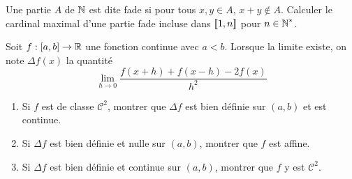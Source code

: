 \begin{exo}
    \label{misc1}
    Une partie $A$ de $\operatorname{\mathbb N}$ est dite fade si pour tous $x,y\in A$, $x+y\notin A$.
    Calculer le cardinal maximal d'une partie fade incluse dans $[\![1,n]\!]$ pour $n\in\operatorname{\mathbb N}^*$.
\end{exo}

\begin{exo}
    \label{misc2}
    Soit $f:[a,b]\to\operatorname{\mathbb R}$ une fonction continue avec $a<b$. 
    Lorsque la limite existe, on note $\Delta f(x)$ la quantité 
    \[
        \lim_{h\to 0}\frac{f(x+h)+f(x-h)-2f(x)}{h^2}
    \]
    \begin{enumerate}
        \item Si $f$ est de classe $\mathcal C^2$, montrer que $\Delta f$ est bien définie sur $(a,b)$ et est continue.
        \item Si $\Delta f$ est bien définie et nulle sur $(a,b)$, montrer que $f$ est affine.
        \item Si $\Delta f$ est bien définie et continue sur $(a,b)$, montrer que $f$ y est $\mathcal C^2$. 
    \end{enumerate}
\end{exo}